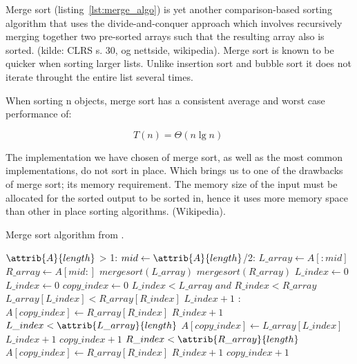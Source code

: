 \documentclass[sigconf, nonacm, natbib, screen, balance=False]{acmart}
\begin{document}
Merge sort (listing~\ref{lst:merge_algo}) is yet another comparison-based sorting algorithm that uses the divide-and-conquer approach which involves recursively merging together two pre-sorted arrays such that the resulting array also is sorted. (kilde: CLRS s. 30, og nettside, wikipedia). Merge sort is known to be quicker when sorting larger lists. Unlike insertion sort and bubble sort it does not iterate throught the entire list several times. 

When sorting n objects, merge sort has a consistent average and worst case performance of: 

\begin{equation}
  T(n) = \Theta(n\lg n) \;  \label{eq:merge_sort_best}
\end{equation}

The implementation we have chosen of merge sort, as well as the most common implementations, do not sort in place. Which brings us to one of the drawbacks of merge sort; its memory requirement. The memory size of the input must be allocated for the sorted output to be sorted in, hence it uses more memory space than other in place sorting algorithms. (Wikipedia). 

\begin{listing}
  \caption{Merge sort algorithm from \citet[Ch.~2.1]{CLRS_2009}.}
  \label{lst:merge_algo}

  \begin{codebox}
    \li \If $\attrib{A}{length}$ > 1: 
    \li \Do
    $mid \gets \attrib{A}{length}$/2: 
    \li $L\_array\gets A[:mid]$
    \li $R\_array\gets A[mid:]$
    \li $mergesort(L\_array)$
    \li $mergesort(R\_array)$
    \li $L\_index\gets 0$
    \li $L\_index\gets 0$
    \li $copy\_index\gets 0$
    \li \While $L\_index < L\_array$ $and$ $R\_index < R\_array$ 
    \li \Do
    \If $L\_array[L\_index] < R\_array[R\_index]$
    \li \Do
    $L\_index + 1$
    \li \Else:
    \li $A[copy\_index] \gets R\_array[R\_index]$
    \li $R\_index + 1$
    \End
    \End
    \li \While $L\_index < \attrib{L\_array}{length}$
    \li \Do
    $A[copy\_index] \gets L\_array[L\_index]$
    \li $L\_index + 1$
    \li $copy\_index + 1$
    \End
    \li \While $R\_index < \attrib{R\_array}{length}$
    \li \Do
    $A[copy\_index] \gets R\_array[R\_index]$
    \li $R\_index + 1$
    \li $copy\_index + 1$    
  \end{codebox}
\end{listing}
\end{document}
